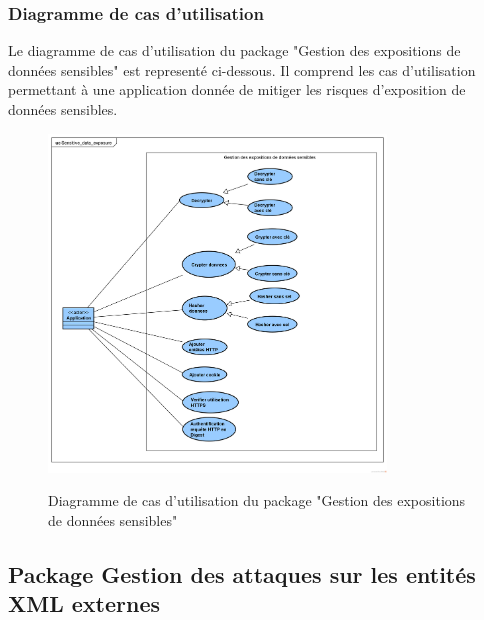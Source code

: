 \subsubsection{Diagramme de cas d'utilisation}
Le diagramme de cas d'utilisation du package "Gestion des expositions de données sensibles" est representé ci-dessous. Il comprend les cas d'utilisation permettant à une application donnée de mitiger les risques d'exposition de données sensibles.\\ 
\begin{figure}[H]
	\centering
	\begin{minipage}{14cm}
		\centering
		{\includegraphics[width=0.8\textwidth,height=0.30\textheight]{fig/Gestion-exposition-donnees-use-case-diagram.png}}
	\end{minipage}
	\caption{Diagramme de cas d'utilisation du package "Gestion des expositions de données sensibles"}
	\label{fig:7.4}
\end{figure}

\subsection{Package Gestion des attaques sur les entités XML externes}
